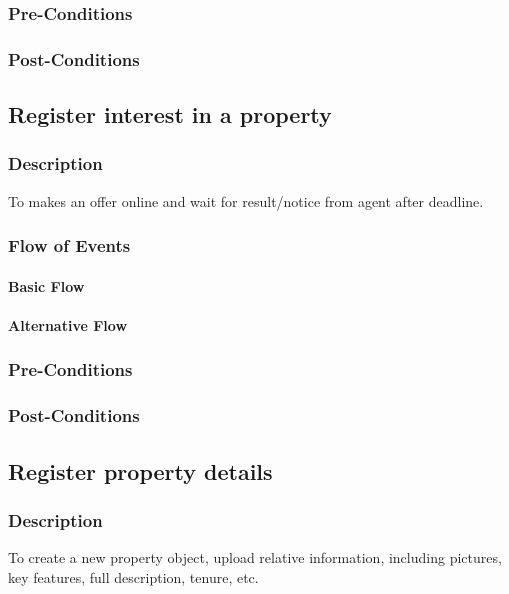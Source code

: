 \documentclass[a4paper,12pt]{article}
\begin{document}
\subsubsection{Pre-Conditions}
\subsubsection{Post-Conditions}

\subsection{Register interest in a property}
\subsubsection{Description}
To makes an offer online and wait for result/notice from agent after deadline.
\subsubsection{Flow of Events}
\paragraph{Basic Flow}
\begin{itemize}
\end{itemize}

\paragraph{Alternative Flow}
\begin{itemize}
\end{itemize}

\subsubsection{Pre-Conditions}
\subsubsection{Post-Conditions}

\subsection{Register property details}
\subsubsection{Description}
To create a new property object, upload relative information, including pictures, key features, full description, tenure, etc.
\end{document}
